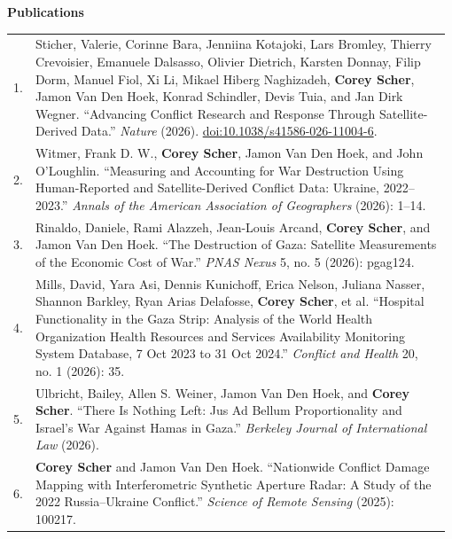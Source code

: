 \documentclass[letterpaper,11pt,oneside]{article}
\begin{document}
\begin{flushleft}\textbf{\Large{Publications}}\end{flushleft}
\vspace{-4ex}
\begin{longtable}{@{}p{0.03\linewidth}p{0.95\linewidth}@{}}

1. & Sticher, Valerie, Corinne Bara, Jenniina Kotajoki, Lars Bromley, Thierry Crevoisier, Emanuele Dalsasso, Olivier Dietrich, Karsten Donnay, Filip Dorm, Manuel Fiol, Xi Li, Mikael Hiberg Naghizadeh, \textbf{Corey Scher}, Jamon Van Den Hoek, Konrad Schindler, Devis Tuia, and Jan Dirk Wegner. “Advancing Conflict Research and Response Through Satellite-Derived Data.” \textit{Nature} (2026). \href{https://doi.org/10.1038/s41586-026-11004-6}{doi:10.1038/s41586-026-11004-6}.\\[1.0ex]

2. & Witmer, Frank D. W., \textbf{Corey Scher}, Jamon Van Den Hoek, and John O’Loughlin. “Measuring and Accounting for War Destruction Using Human-Reported and Satellite-Derived Conflict Data: Ukraine, 2022–2023.” \textit{Annals of the American Association of Geographers} (2026): 1–14.\\[1.0ex]

3. & Rinaldo, Daniele, Rami Alazzeh, Jean-Louis Arcand, \textbf{Corey Scher}, and Jamon Van Den Hoek. “The Destruction of Gaza: Satellite Measurements of the Economic Cost of War.” \textit{PNAS Nexus} 5, no. 5 (2026): pgag124.\\[1.0ex]

4. & Mills, David, Yara Asi, Dennis Kunichoff, Erica Nelson, Juliana Nasser, Shannon Barkley, Ryan Arias Delafosse, \textbf{Corey Scher}, et al. “Hospital Functionality in the Gaza Strip: Analysis of the World Health Organization Health Resources and Services Availability Monitoring System Database, 7 Oct 2023 to 31 Oct 2024.” \textit{Conflict and Health} 20, no. 1 (2026): 35.\\[1.0ex]

5. & Ulbricht, Bailey, Allen S. Weiner, Jamon Van Den Hoek, and \textbf{Corey Scher}. “There Is Nothing Left: Jus Ad Bellum Proportionality and Israel's War Against Hamas in Gaza.” \textit{Berkeley Journal of International Law} (2026).\\[1.0ex]

6. & \textbf{Corey Scher} and Jamon Van Den Hoek. “Nationwide Conflict Damage Mapping with Interferometric Synthetic Aperture Radar: A Study of the 2022 Russia–Ukraine Conflict.” \textit{Science of Remote Sensing} (2025): 100217.\\[1.0ex]


\end{longtable}
\end{document}
